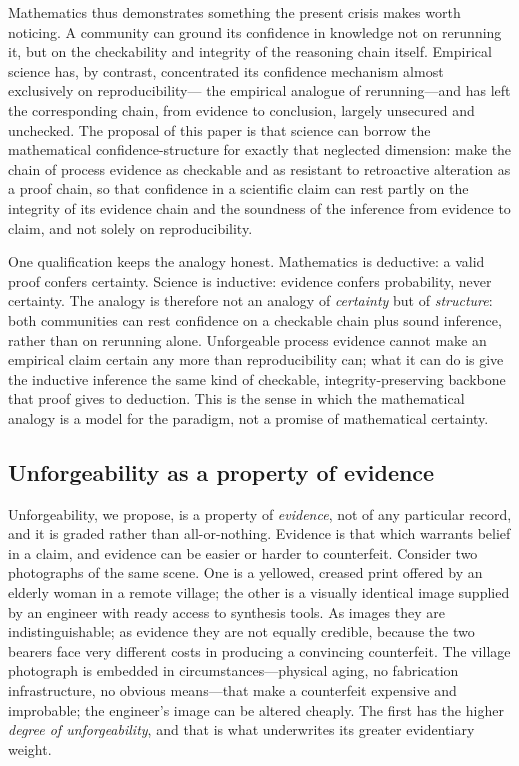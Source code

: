 \documentclass[11pt]{article}
\begin{document}
Mathematics thus demonstrates something the present crisis makes worth noticing. A
community can ground its confidence in knowledge not on rerunning it, but on the
checkability and integrity of the reasoning chain itself. Empirical science has, by
contrast, concentrated its confidence mechanism almost exclusively on reproducibility---
the empirical analogue of rerunning---and has left the corresponding chain, from
evidence to conclusion, largely unsecured and unchecked. The proposal of this paper is
that science can borrow the mathematical confidence-structure for exactly that neglected
dimension: make the chain of process evidence as checkable and as resistant to
retroactive alteration as a proof chain, so that confidence in a scientific claim can
rest partly on the integrity of its evidence chain and the soundness of the inference
from evidence to claim, and not solely on reproducibility.

One qualification keeps the analogy honest. Mathematics is deductive: a valid proof
confers certainty. Science is inductive: evidence confers probability, never certainty.
The analogy is therefore not an analogy of \emph{certainty} but of \emph{structure}:
both communities can rest confidence on a checkable chain plus sound inference, rather
than on rerunning alone. Unforgeable process evidence cannot make an empirical claim
certain any more than reproducibility can; what it can do is give the inductive
inference the same kind of checkable, integrity-preserving backbone that proof gives to
deduction. This is the sense in which the mathematical analogy is a model for the
paradigm, not a promise of mathematical certainty.

\subsection{Unforgeability as a property of evidence}
\label{sec:degree}

Unforgeability, we propose, is a property of \emph{evidence}, not of any particular
record, and it is graded rather than all-or-nothing. Evidence is that which warrants
belief in a claim, and evidence can be easier or harder to counterfeit. Consider two
photographs of the same scene. One is a yellowed, creased print offered by an elderly
woman in a remote village; the other is a visually identical image supplied by an
engineer with ready access to synthesis tools. As images they are indistinguishable; as
evidence they are not equally credible, because the two bearers face very different
costs in producing a convincing counterfeit. The village photograph is embedded in
circumstances---physical aging, no fabrication infrastructure, no obvious means---that
make a counterfeit expensive and improbable; the engineer's image can be altered
cheaply. The first has the higher \emph{degree of unforgeability}, and that is what
underwrites its greater evidentiary weight.
\end{document}
